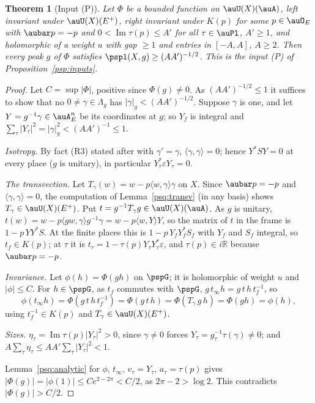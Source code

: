 \documentclass[10pt]{amsart}
\newtheorem{theorem}{Theorem}[section]
\theoremstyle{definition}
\theoremstyle{remark}
\newcommand{\R}{\mathbb R}
\newcommand{\Iml}{\operatorname{Im}}
\begin{document}
\begin{theorem}[Input (P)]\label{psq:peaks}
Let $\Phi$ be a bounded function on $\auU(X)(\auA)$, left invariant under $\auU(X)(E^+)$, right
invariant under $K(p)$ for some $p\in\auO_E$ with $\aubar p=-p$ and $0<\Iml\tau(p)\le A'$ for all
$\tau\in\auPl$, $A'\ge1$, and holomorphic of a weight $u$ with gap $\ge1$ and entries in $[-A,A]$,
$A\ge2$. Then every peak $g$ of $\Phi$ satisfies $\pspl(X,g)\ge(AA')^{-1/2}$. This is the input (P)
of Proposition~\ref{psp:inputs}.
\end{theorem}
\begin{proof}
Let $C=\sup|\Phi|$, positive since $\Phi(g)\ne0$. As $(AA')^{-1/2}\le1$ it suffices to show that no
$0\ne\gamma\in\Lambda_g$ has $|\gamma|_g<(AA')^{-1/2}$. Suppose $\gamma$ is one, and let
$Y=g^{-1}\gamma\in\auA_E^n$ be its coordinates at $g$; so $Y_f$ is integral and $\sum_\tau|Y_\tau|^2=
|\gamma|_g^2<(AA')^{-1}\le1$.

\emph{Isotropy.} By fact (R3) stated after {\cite[Definition~3.27]{P53}} with $\gamma'=\gamma$, $\langle\gamma,\gamma\rangle=0$;
hence $Y^*SY=0$ at every place ($g$ is unitary), in particular $Y_\tau^*\varepsilon Y_\tau=0$.

\emph{The transvection.} Let $T_\gamma(w)=w-p\langle w,\gamma\rangle\gamma$ on $X$. Since
$\aubar p=-p$ and $\langle\gamma,\gamma\rangle=0$, the computation of Lemma~\ref{psq:transv} (in any
basis) shows $T_\gamma\in\auU(X)(E^+)$. Put $t=g^{-1}T_\gamma g\in\auU(X)(\auA)$. As $g$ is unitary,
$t(w)=w-p\langle gw,\gamma\rangle g^{-1}\gamma=w-p\langle w,Y\rangle Y$, so the matrix of $t$ in the
frame is $1-p\,YY^*S$. At the finite places this is $1-p\,Y_fY_f^*S_f$ with $Y_f$ and $S_f$ integral,
so $t_f\in K(p)$; at $\tau$ it is $t_\tau=1-\tau(p)Y_\tau Y_\tau^*\varepsilon$, and $\tau(p)\in i\R$
because $\aubar p=-p$.

\emph{Invariance.} Let $\phi(h)=\Phi(gh)$ on $\pspG$; it is holomorphic of weight $u$ and $|\phi|\le C$.
For $h\in\pspG$, as $t_f$ commutes with $\pspG$, $g\,t_\infty h=g\,t\,h\,t_f^{-1}$, so
\[
\phi(t_\infty h)=\Phi(g\,t\,h\,t_f^{-1})=\Phi(g\,t\,h)=\Phi(T_\gamma\,g\,h)=\Phi(gh)=\phi(h),
\]
using $t_f^{-1}\in K(p)$ and $T_\gamma\in\auU(X)(E^+)$.

\emph{Sizes.} $\eta_\tau=\Iml\tau(p)|Y_\tau|^2>0$, since $\gamma\ne0$ forces $Y_\tau=g_\tau^{-1}\tau(\gamma)\ne0$;
and $A\sum_\tau\eta_\tau\le AA'\sum_\tau|Y_\tau|^2<1$.

Lemma~\ref{psq:analytic} for $\phi$, $t_\infty$, $v_\tau=Y_\tau$, $a_\tau=\tau(p)$ gives $|\Phi(g)|=
|\phi(1)|\le Ce^{2-2\pi}<C/2$, as $2\pi-2>\log2$. This contradicts $|\Phi(g)|>C/2$.
\end{proof}
\end{document}
